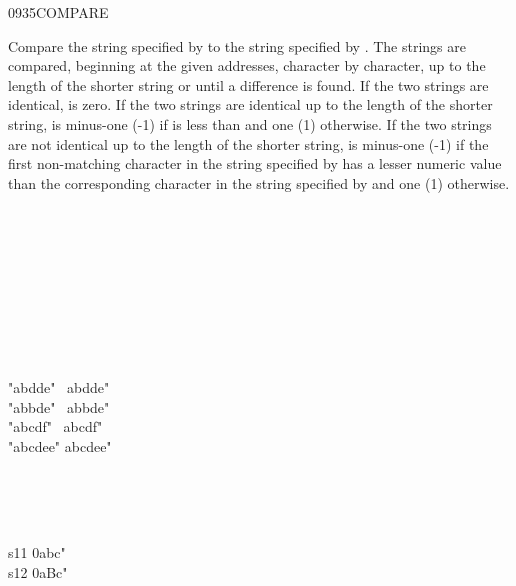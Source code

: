 \begin{worddef}{0935}{COMPARE}
\item {}

	Compare the string specified by  to the
	string specified by . The strings are
	compared, beginning at the given addresses, character by
	character, up to the length of the shorter string or until a
	difference is found. If the two strings are identical, 
	is zero. If the two strings are identical up to the length of
	the shorter string,  is minus-one (-1) if 
	is less than  and one (1) otherwise. If the two
	strings are not identical up to the length of the shorter string,
	 is minus-one (-1) if the first non-matching character
	in the string specified by  has a lesser
	numeric value than the corresponding character in the string
	specified by  and one (1) otherwise.

	\begin{testing} %
		\ttfamily
		 \\
		 \tab {}  \\
		 \\
		 \\
		 \\
		 \\
		 \\
		 \\

		\word{:} "abdde"~  abdde"~ \word{;} \\
		\word{:} "abbde"~  abbde"~ \word{;} \\
		\word{:} "abcdf"~  abcdf"~ \word{;} \\
		\word{:} "abcdee"  abcdee" \word{;}

		 \\
		 \\
		 \\

		\word{:} s11  0abc" \word{;} \\
		\word{:} s12  0aBc" \word{;}

		 \\
	\end{testing}
\end{worddef}


